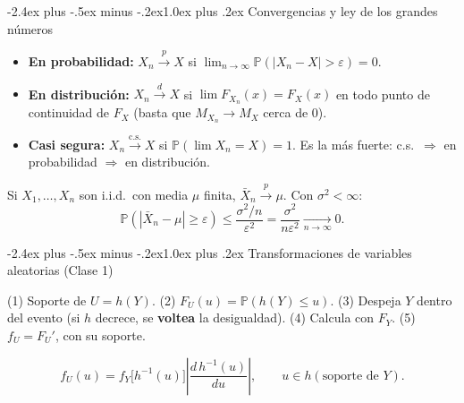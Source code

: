 \documentclass[10pt,a4paper]{article}
\makeatletter
\newcommand{\Prob}{\mathbb{P}}
\newcommand{\dto}{\xrightarrow{\;d\;}}
\newcommand{\pto}{\xrightarrow{\;p\;}}
\newcommand{\dcs}{\xrightarrow{\mathrm{c.s.}}}
\renewcommand\section{\@startsection{section}{1}{0pt}%
  {-2.4ex plus -.5ex minus -.2ex}{1.0ex plus .2ex}%
  {\normalfont\large\bfseries\color{seccolor}}}
\makeatother
\begin{document}
\section{Convergencias y ley de los grandes números}

\begin{defbox}[frametitle={Tipos de convergencia}]
\begin{itemize}
  \item \textbf{En probabilidad:} $X_n\pto X$ si
        $\displaystyle\lim_{n\to\infty}\Prob(|X_n-X|>\varepsilon)=0$.
  \item \textbf{En distribución:} $X_n\dto X$ si $\lim F_{X_n}(x)=F_X(x)$ en
        todo punto de continuidad de $F_X$ (basta que $M_{X_n}\to M_X$ cerca
        de $0$).
  \item \textbf{Casi segura:} $X_n\dcs X$ si $\Prob(\lim X_n=X)=1$. Es la más
        fuerte: c.s.\ $\Rightarrow$ en probabilidad $\Rightarrow$ en
        distribución.
\end{itemize}
\end{defbox}

\begin{thmbox}[frametitle={LGN y su prueba con Chebyshev}]
Si $X_1,\dots,X_n$ son i.i.d.\ con media $\mu$ finita, $\bar X_n\pto\mu$. Con
$\sigma^2<\infty$:
\[
\Prob(|\bar X_n-\mu|\ge\varepsilon)\le\frac{\sigma^2/n}{\varepsilon^2}
=\frac{\sigma^2}{n\varepsilon^2}\xrightarrow[n\to\infty]{}0 .
\]
\end{thmbox}

\section{Transformaciones de variables aleatorias \textmd{(Clase 1)}}

\begin{notebox}[frametitle={Método de la acumulada (el más general)}]
(1) Soporte de $U=h(Y)$. (2) $F_U(u)=\Prob(h(Y)\le u)$. (3) Despeja $Y$ dentro
del evento (si $h$ decrece, se \textbf{voltea} la desigualdad). (4) Calcula con
$F_Y$. (5) $f_U=F_U'$, con su soporte.
\end{notebox}

\begin{thmbox}[frametitle={Jacobiano, una variable ($h$ monótona)}]
\[
f_U(u)=f_Y\big[h^{-1}(u)\big]\left|\frac{d\,h^{-1}(u)}{du}\right|,\qquad
u\in h(\text{soporte de }Y).
\]
\end{thmbox}
\end{document}
